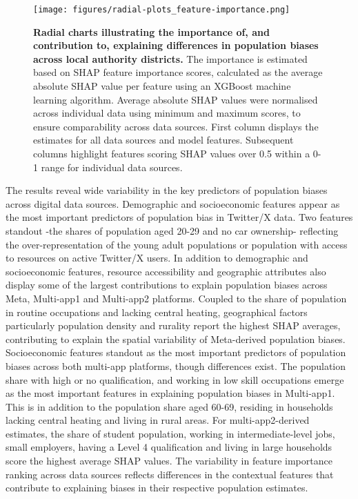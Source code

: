\documentclass[]{rsos}%
\begin{document}
\begin{figure}
\centering
\texttt{[image: figures/radial-plots\_feature-importance.png]}
\caption{\textbf{Radial charts illustrating the importance of, and contribution to, explaining differences in population biases across local authority districts.} The importance is estimated based on SHAP feature importance scores, calculated as the average absolute SHAP value per feature using an XGBoost machine learning algorithm. Average absolute SHAP values were normalised across individual data using minimum and maximum scores, to ensure comparability across data sources. First column displays the estimates for all data sources and model features. Subsequent columns highlight features scoring SHAP values over 0.5 within a 0-1 range for individual data sources.}\label{fig:radialplots}
\end{figure}

The results reveal wide variability in the key predictors of population biases across digital data sources. Demographic and socioeconomic features appear as the most important predictors of population bias in Twitter/X data. Two features standout -the shares of population aged 20-29 and no car ownership- reflecting the over-representation of the young adult populations or population with access to resources on active Twitter/X users. In addition to demographic and socioeconomic features, resource accessibility and geographic attributes also display some of the largest contributions to explain population biases across Meta, Multi-app1 and Multi-app2 platforms. Coupled to the share of population in routine occupations and lacking central heating, geographical factors particularly population density and rurality report the highest SHAP averages, contributing to explain the spatial variability of Meta-derived population biases. Socioeconomic features standout as the most important predictors of population biases across both multi-app platforms, though differences exist. The population share with high or no qualification, and working in low skill occupations emerge as the most important features in explaining population biases in Multi-app1. This is in addition to the population share aged 60-69, residing in households lacking central heating and living in rural areas. For multi-app2-derived estimates, the share of student population, working in intermediate-level jobs, small employers, having a Level 4 qualification and living in large households score the highest average SHAP values. The variability in feature importance ranking across data sources reflects differences in the contextual features that contribute to explaining biases in their respective population estimates.
\end{document}
